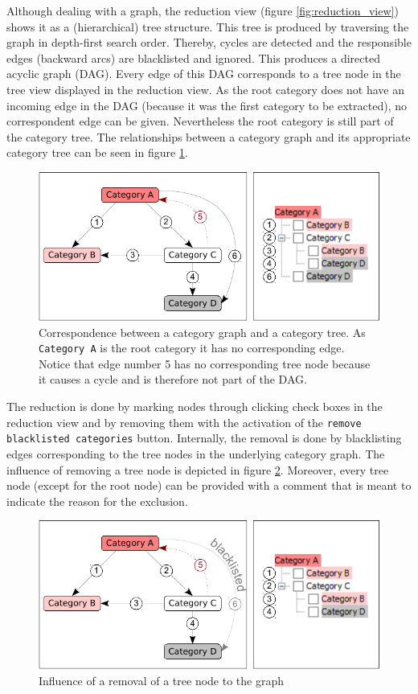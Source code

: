 \documentclass{scrartcl}
\begin{document}
Although dealing with a graph, the reduction view (figure \ref{fig:reduction_view}) shows it as a (hierarchical) tree structure. This tree is produced by traversing the graph in depth-first search order. Thereby, cycles are detected and the responsible edges (backward arcs) are blacklisted and ignored. This produces a directed acyclic graph (DAG). Every edge of this DAG corresponds to a tree node in the tree view displayed in the reduction view. As the root category does not have an incoming edge in the DAG (because it was the first category to be extracted), no correspondent edge can be given. Nevertheless the root category is still part of the category tree. The relationships between a category graph and its appropriate category tree can be seen in figure \ref{fig:graph_tree}.

\begin{figure}[ht]
\centering
\includegraphics[scale=0.8]{figures/graph_tree.pdf}
\caption{Correspondence between a category graph and a category tree. As \texttt{Category A} is the root category it has no corresponding edge. Notice that edge number 5 has no corresponding tree node because it causes a cycle and is therefore not part of the DAG.}
\label{fig:graph_tree}
\end{figure}

The reduction is done by marking nodes through clicking check boxes in the reduction view and by removing them with the activation of the \texttt{remove blacklisted categories} button. Internally, the removal is done by blacklisting edges corresponding to the tree nodes in the underlying category graph. The influence of removing a tree node is depicted in figure \ref{fig:graph_tree_blacklisted}. Moreover, every tree node (except for the root node) can be provided with a comment that is meant to indicate the reason for the exclusion.

\begin{figure}[ht]
\centering
\includegraphics[scale=0.8]{figures/graph_tree_blacklisted.pdf}
\caption{Influence of a removal of a tree node to the graph}
\label{fig:graph_tree_blacklisted}
\end{figure}
\end{document}

